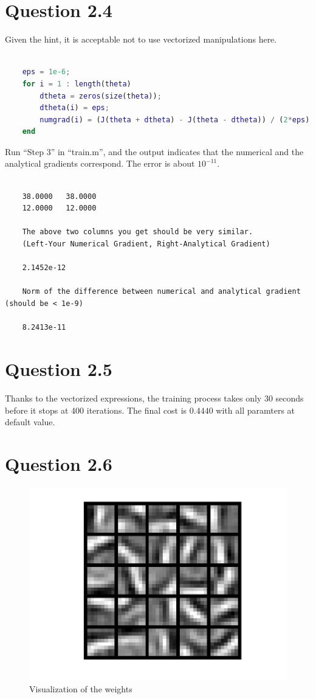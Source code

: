 \documentclass{article}
\begin{document}
\section*{Question 2.4}
{
    Given the hint, it is acceptable not to use vectorized manipulations here.

    \begin{lstlisting}[language=MATLAB]

    eps = 1e-6;
    for i = 1 : length(theta)
        dtheta = zeros(size(theta));
        dtheta(i) = eps;
        numgrad(i) = (J(theta + dtheta) - J(theta - dtheta)) / (2*eps);
    end

    \end{lstlisting}

    Run ``Step 3'' in ``train.m'', and the output indicates that the numerical and the analytical gradients correspond. The error is about $10^{-11}$.
    \begin{lstlisting}

    38.0000   38.0000
    12.0000   12.0000
    
    The above two columns you get should be very similar.
    (Left-Your Numerical Gradient, Right-Analytical Gradient)
    
    2.1452e-12
    
    Norm of the difference between numerical and analytical gradient (should be < 1e-9)

    8.2413e-11

    \end{lstlisting}

}

\section*{Question 2.5}
{
    Thanks to the vectorized expressions, the training process takes only 30 seconds before it stops at 400 iterations. The final cost is $0.4440$ with all paramters at default value.
}

\section*{Question 2.6}
{
    \begin{figure}[H]
        \centering
        \includegraphics[width = 0.7\linewidth]{src2/weights.jpg}
        \caption{Visualization of the weights}
    \end{figure}
}
\end{document}
